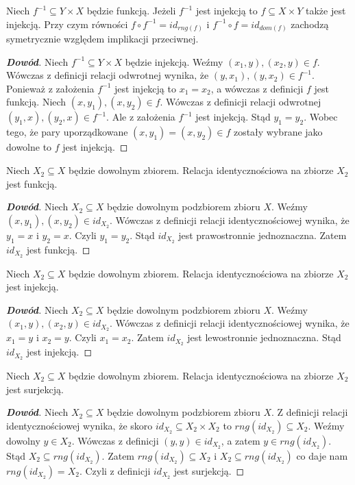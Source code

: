 \begin{theorem}
Niech $f^{-1}\subseteq Y\times X$ będzie funkcją. Jeżeli $f^{-1}$ jest injekcją to $f\subseteq X\times Y$ także jest injekcją. Przy czym równości $f\circ f^{-1}=id_{rng(f)}$ i $f^{-1}\circ f=id_{dom(f)}$ zachodzą symetrycznie względem implikacji przeciwnej.
\end{theorem}
\begin{proof}[\textbf{Dowód}]
Niech $f^{-1}\subseteq Y\times X$ będzie injekcją. Weźmy $(x_{1},y),(x_{2},y)\in f$. Wówczas z definicji relacji odwrotnej wynika, że $(y,x_{1}),(y,x_{2})\in f^{-1}$. Ponieważ z założenia $f^{-1}$ jest injekcją to $x_{1}=x_{2}$, a wówczas z definicji $f$ jest funkcją. Niech $(x,y_{1}),(x,y_{2})\in f$. Wówczas z definicji relacji odwrotnej $(y_{1},x),(y_{2},x)\in f^{-1}$. Ale z założenia $f^{-1}$ jest injekcją. Stąd $y_{1}=y_{2}$. Wobec tego, że pary uporządkowane $(x,y_{1})=(x,y_{2})\in f$ zostały wybrane jako dowolne to $f$ jest injekcją.
\end{proof}
\begin{theorem}
Niech $X_{2}\subseteq X$ będzie dowolnym zbiorem. Relacja identycznościowa na zbiorze $X_{2}$ jest funkcją.
\end{theorem}
\begin{proof}[\textbf{Dowód}]
Niech $X_{2}\subseteq X$ będzie dowolnym podzbiorem zbioru $X$. Weźmy $(x,y_{1}),(x,y_{2})\in id_{X_{2}}$. Wówczas z definicji relacji identycznościowej wynika, że $y_{1}=x$ i $y_{2}=x$. Czyli $y_{1}=y_{2}$. Stąd $id_{X_{2}}$ jest prawostronnie jednoznaczna. Zatem $id_{X_{2}}$ jest funkcją.
\end{proof}
\begin{theorem}
Niech $X_{2}\subseteq X$ będzie dowolnym zbiorem. Relacja identycznościowa na zbiorze $X_{2}$ jest injekcją.
\end{theorem}
\begin{proof}[\textbf{Dowód}]
Niech $X_{2}\subseteq X$ będzie dowolnym podzbiorem zbioru $X$. Weźmy $(x_{1},y),(x_{2},y)\in id_{X_{2}}$. Wówczas z definicji relacji identycznościowej wynika, że $x_{1}=y$ i $x_{2}=y$. Czyli $x_{1}=x_{2}$. Zatem $id_{X_{2}}$ jest lewostronnie jednoznaczna. Stąd $id_{X_{2}}$ jest injekcją.
\end{proof}
\begin{theorem}
Niech $X_{2}\subseteq X$ będzie dowolnym zbiorem. Relacja identycznościowa na zbiorze $X_{2}$ jest surjekcją.
\end{theorem}
\begin{proof}[\textbf{Dowód}]
Niech $X_{2}\subseteq X$ będzie dowolnym podzbiorem zbioru $X$. Z definicji relacji identycznościowej wynika, że skoro $id_{X_{2}}\subseteq X_{2}\times X_{2}$ to $rng(id_{X_{2}})\subseteq X_{2}$. Weźmy dowolny $y\in X_{2}$. Wówczas z definicji $(y,y)\in id_{X_{2}}$, a zatem $y\in rng(id_{X_{2}})$. Stąd $X_{2}\subseteq rng(id_{X_{2}})$. Zatem $rng(id_{X_{2}})\subseteq X_{2}$ i $X_{2}\subseteq rng(id_{X_{2}})$ co daje nam $rng(id_{X_{2}})=X_{2}$. Czyli z definicji $id_{X_{2}}$ jest surjekcją.
\end{proof}
